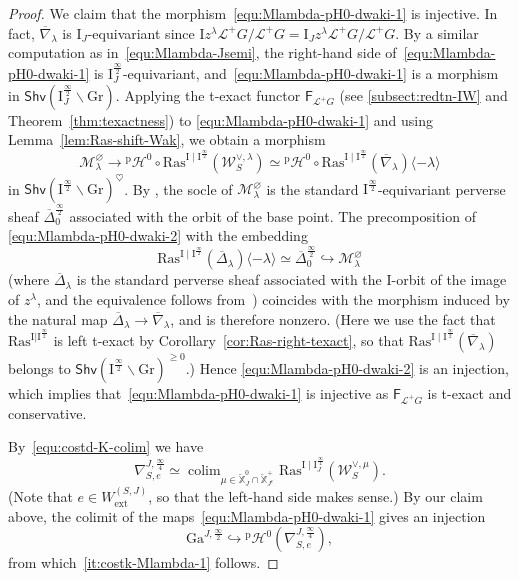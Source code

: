 \documentclass[11pt]{amsart}
\numberwithin{equation}{section}
\theoremstyle{plain}
\theoremstyle{definition}
\newcommand{\sH}{{\mathcal H}}
\newcommand{\I}{{\mathrm I}}
\newcommand{\sL}{{\mathcal L}}
\newcommand{\sM}{{\mathcal M}}
\newcommand{\sW}{{\mathcal W}}
\newcommand{\X}{{\mathbb X}}
\newcommand{\Xd}{\check{\X}}
\newcommand{\semi}{{{\frac{\infty}{2}}}}
\newcommand{\quar}{{{\frac{\infty}{4}}}}
\newcommand{\ex}{\mathrm{ext}}
\newcommand{\Shv}{\mathsf{Shv}}
\newcommand{\Ras}{\mathrm{Ras}}
\newcommand{\Gr}{\mathrm{Gr}}
\newcommand{\comp}{\mathrm{c}}
\newcommand{\Gait}{\mathrm{Ga}}
\DeclareMathOperator*{\colim}{colim}
\begin{document}
\begin{proof}
We claim that the morphism~\eqref{equ:Mlambda-pH0-dwaki-1} is injective. In fact, $\overline{\nabla}_\lambda$ is $\I_J$-equivariant since 
$\I z^{\lambda} \sL^+G/\sL^+G=\I_J z^{\lambda} \sL^+G/\sL^+G$. 
By a similar computation as in~\eqref{equ:Mlambda-Jsemi}, the right-hand side of~\eqref{equ:Mlambda-pH0-dwaki-1} is $\I^\semi_J$-equivariant, and~\eqref{equ:Mlambda-pH0-dwaki-1} is a morphism in $\Shv\left( \I^\semi_J \backslash \Gr \right)$. 
Applying the t-exact functor $\mathsf{F}_{\sL^+G}$ (see \textsection\ref{subsect:redtn-IW} and Theorem~\ref{thm:texactness}) to \eqref{equ:Mlambda-pH0-dwaki-1} and using Lemma~\ref{lem:Ras-shift-Wak}, we obtain a morphism
\begin{equation}
\label{equ:Mlambda-pH0-dwaki-2}
\sM^{\varnothing}_\lambda \rightarrow {}^{\mathrm{p}}\sH^0\circ \Ras^{\I\mid \I^\semi}(\sW^{\vee,\lambda}_S) 
\simeq {}^{\mathrm{p}}\sH^0\circ \Ras^{\I\mid \I^\semi}(\overline{\nabla}_\lambda)\langle -\lambda \rangle
\end{equation}
in $\Shv\left( \I^\semi \backslash \Gr \right)^\heartsuit$.
By \cite[Corollary 6.22]{adr}, the socle of $\sM^{\varnothing}_\lambda$ is the standard $\I^\semi$-equivariant perverse sheaf $\overline{\Delta}^\semi_{0}$ associated with the orbit of the base point. 
The precomposition of \eqref{equ:Mlambda-pH0-dwaki-2} with the embedding
\[
\Ras^{\I\mid \I^\semi}(\overline{\Delta}_{\lambda})\langle -\lambda \rangle \simeq \overline{\Delta}^\semi_{0} \hookrightarrow \sM^{\varnothing}_\lambda
\]
(where $\overline{\Delta}_{\lambda}$ is the standard perverse sheaf associated with the $\I$-orbit of the image of $z^\lambda$, and the equivalence follows from~\cite[Proposition~5.6]{adr})
coincides with the morphism induced by the natural map $\overline{\Delta}_{\lambda} \rightarrow \overline{\nabla}_{\lambda}$, and is therefore nonzero. (Here we use the fact that $\Ras^{\I | \I^\semi}$ is left t-exact by Corollary~\ref{cor:Ras-right-texact}, so that $\Ras^{\I\mid \I^\semi}(\overline{\nabla}_\lambda)$ belongs to $\Shv ( \I^\semi \backslash \Gr )^{\geq 0}$.)
Hence \eqref{equ:Mlambda-pH0-dwaki-2} is an injection, which implies that~\eqref{equ:Mlambda-pH0-dwaki-1} is injective as $\mathsf{F}_{\sL^+G}$ is t-exact and conservative. 

By~\eqref{equ:costd-K-colim} we have 
\[
\nabla^{J,\quar}_{S,e}\simeq \colim_{\mu\in \Xd^0_J\cap \Xd^+_{J^\comp}} \Ras^{\I\mid \I^\quar_J}(\sW^{\vee,\mu}_S). 
\]
(Note that $e \in W_\ex^{(S,J)}$, so that the left-hand side makes sense.)
By our claim above, the colimit of the maps~\eqref{equ:Mlambda-pH0-dwaki-1} gives an injection 
\[
\Gait^{J,\semi} \hookrightarrow {}^{\mathrm{p}}\sH^0(\nabla^{J,\quar}_{S,e}), 
\]
from which~\eqref{it:costk-Mlambda-1} follows. 


\end{proof}
\end{document}
